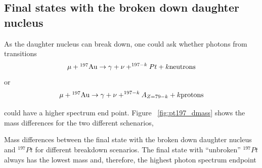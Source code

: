 \subsection{Final states with the broken down  daughter nucleus}

As the daughter nucleus can break down, one could ask whether photons from
transitions
$$
\mu + \mbox{$\rm ^{197}Au$} \rightarrow \gamma + \nu + ^{197-k}Pt + k \rm neutrons
$$
or 
$$
\mu + \mbox{$\rm ^{197}Au$} \rightarrow \gamma + \nu + ^{197-k}A_{Z=79-k} + k \rm protons
$$

could have a higher spectrum end point. Figure ~\ref{fig:pt197_dmass} shows the
mass differences for the two different schenarios, 
  
\vspace{0.1in}
 {
  \label{fig:pt197_dmass}
  Mass differences between the final state with the broken down daughter nucleus
  and $^{197} Pt$ for different breakdown scenarios.
  The final state with ``unbroken'' $^{197} Pt$ always has the lowest mass and,
  therefore, the highest photon spectrum endpoint
}
\vspace{0.1in}

